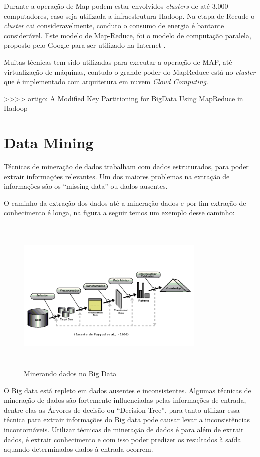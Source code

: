 \documentclass[conference,compsoc]{IEEEtran}
\begin{document}
Durante a operação de Map podem estar envolvidos \textit{clusters} de até 3.000 computadores, caso seja utilizada a infraestrutura Hadoop. Na etapa de Recude o \textit{cluster} cai consideravelmente, conduto o consumo de energia é bantante considerável. \cite{Conejero2015}
Este modelo de Map-Reduce, foi o modelo de computação paralela, proposto pelo Google para ser utilizado na Internet \cite{Dean2008}.

Muitas técnicas tem sido utilizadas para executar a operação de MAP, até virtualização de máquinas, contudo o grande poder do MapReduce está no \textit{cluster} que é implementado com arquitetura em nuvem \textit{Cloud Computing}.


>>>> artigo: A Modified Key Partitioning for BigData Using MapReduce in Hadoop

\section{Data Mining}

Técnicas de mineração de dados trabalham com dados estruturados, para poder extrair informações relevantes.
Um dos maiores problemas na extração de informações são os ``missing data'' ou dados ausentes. 

O caminho da extração dos dados até a mineração dados e por fim extração de conhecimento é longa, na figura a seguir temos um exemplo desse caminho:

\begin{figure}[ht]
\centering
\caption{Minerando dados no Big Data}
\flushleft
\includegraphics[width=90mm, height=75mm]{Figuras/FayyadSemFundo.png}
\end{figure}


O Big data está repleto em dados ausentes e inconsistentes. Algumas técnicas de mineração de dados são fortemente influenciadas pelas informações de entrada, dentre elas as Árvores de decisão ou ``Decision Tree'', para tanto utilizar essa técnica para extrair informações do Big data pode causar levar a inconsistências incontornáveis.
Utilizar técnicas de mineração de dados é para além de extrair dados, é extrair conhecimento e com isso poder predizer os resultados à saída aquando determinados dados à entrada ocorrem. \cite{Amin2015}
\end{document}

